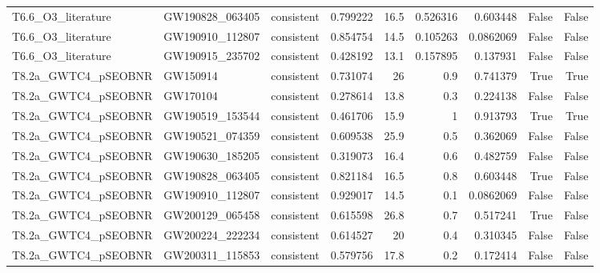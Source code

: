 \begin{tabular}{lllrrrrrr}
T6.6\_O3\_literature & GW190828\_063405 & consistent & 0.799222 & 16.5 & 0.526316 & 0.603448 & False & False \\
T6.6\_O3\_literature & GW190910\_112807 & consistent & 0.854754 & 14.5 & 0.105263 & 0.0862069 & False & False \\
T6.6\_O3\_literature & GW190915\_235702 & consistent & 0.428192 & 13.1 & 0.157895 & 0.137931 & False & False \\
T8.2a\_GWTC4\_pSEOBNR & GW150914 & consistent & 0.731074 & 26 & 0.9 & 0.741379 & True & True \\
T8.2a\_GWTC4\_pSEOBNR & GW170104 & consistent & 0.278614 & 13.8 & 0.3 & 0.224138 & False & False \\
T8.2a\_GWTC4\_pSEOBNR & GW190519\_153544 & consistent & 0.461706 & 15.9 & 1 & 0.913793 & True & True \\
T8.2a\_GWTC4\_pSEOBNR & GW190521\_074359 & consistent & 0.609538 & 25.9 & 0.5 & 0.362069 & False & False \\
T8.2a\_GWTC4\_pSEOBNR & GW190630\_185205 & consistent & 0.319073 & 16.4 & 0.6 & 0.482759 & False & False \\
T8.2a\_GWTC4\_pSEOBNR & GW190828\_063405 & consistent & 0.821184 & 16.5 & 0.8 & 0.603448 & True & False \\
T8.2a\_GWTC4\_pSEOBNR & GW190910\_112807 & consistent & 0.929017 & 14.5 & 0.1 & 0.0862069 & False & False \\
T8.2a\_GWTC4\_pSEOBNR & GW200129\_065458 & consistent & 0.615598 & 26.8 & 0.7 & 0.517241 & True & False \\
T8.2a\_GWTC4\_pSEOBNR & GW200224\_222234 & consistent & 0.614527 & 20 & 0.4 & 0.310345 & False & False \\
T8.2a\_GWTC4\_pSEOBNR & GW200311\_115853 & consistent & 0.579756 & 17.8 & 0.2 & 0.172414 & False & False \\
\bottomrule
\end{tabular}
